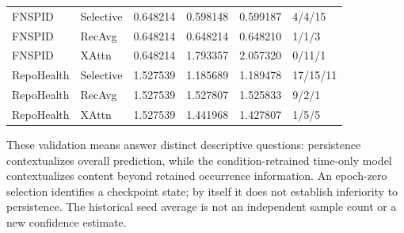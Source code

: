 \begin{table}[htbp]
\begin{tabular}{llllll}
FNSPID & Selective & 0.648214 & 0.598148 & 0.599187 & 4/4/15\\
FNSPID & RecAvg & 0.648214 & 0.648214 & 0.648210 & 1/1/3\\
FNSPID & XAttn & 0.648214 & 1.793357 & 2.057320 & 0/11/1\\
RepoHealth & Selective & 1.527539 & 1.185689 & 1.189478 & 17/15/11\\
RepoHealth & RecAvg & 1.527539 & 1.527807 & 1.525833 & 9/2/1\\
RepoHealth & XAttn & 1.527539 & 1.441968 & 1.427807 & 1/5/5\\
\bottomrule
\end{tabular}
\end{table}

These validation means answer distinct descriptive questions: persistence contextualizes overall prediction, while the condition-retrained time-only model contextualizes content beyond retained occurrence information. An epoch-zero selection identifies a checkpoint state; by itself it does not establish inferiority to persistence. The historical seed average is not an independent sample count or a new confidence estimate.

